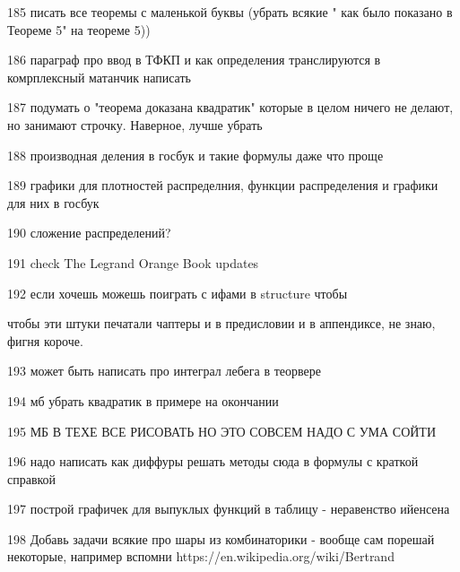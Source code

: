 \begin{itemize}
185 писать все теоремы с маленькой буквы (убрать всякие " как было показано в Теореме 5" на теореме 5))

186 параграф про ввод в ТФКП и как определения транслируются в комрплексный матанчик написать 

187 подумать о "теорема доказана квадратик" которые в целом ничего не делают, но занимают строчку. Наверное, лучше убрать

188 производная деления в госбук и такие формулы даже что проще

189 графики для плотностей распределния, функции распределения и графики для них в госбук

190 сложение распределений? 

191 check The Legrand Orange Book updates

192 если хочешь можешь поиграть с ифами в structure чтобы 

\fancyhead[LO]{\nouppercase{\footnotesize\sffamily \rightmark}} %

\makeatletter
\newcommand{\inappendix}{TT\fi\expandafter\ifx\@chapapp\appendixname}
\makeatother
\makeatletter
\renewcommand{\chaptermark}[1]{
	\if\inappendix
	\markboth{#1}{}
	\else
	\if@mainmatter
	\markboth{\ifnum\value{secnumdepth}>-1 \chaptertitlename\thechapter \else #1 \fi}{}
	\else
	\markboth{#1}{}
	\fi
	\fi
}
\makeatother

\renewcommand{\sectionmark}[1]{\markright{\thesection\hspace{5pt}#1}{}} %

чтобы эти штуки печатали чаптеры и в предисловии и в аппендиксе, не знаю, фигня короче.

193 может быть написать про интеграл лебега в теорвере

194 мб убрать квадратик в примере на окончании

195 МБ В ТЕХЕ ВСЕ РИСОВАТЬ НО ЭТО СОВСЕМ НАДО С УМА СОЙТИ

196 надо написать как диффуры решать методы сюда в формулы с краткой справкой

197 построй графичек для выпуклых функций в таблицу - неравенство ийенсена

198 Добавь задачи всякие про шары из комбинаторики - вообще сам порешай некоторые, например вспомни https://en.wikipedia.org/wiki/Bertrand%


\end{itemize}

